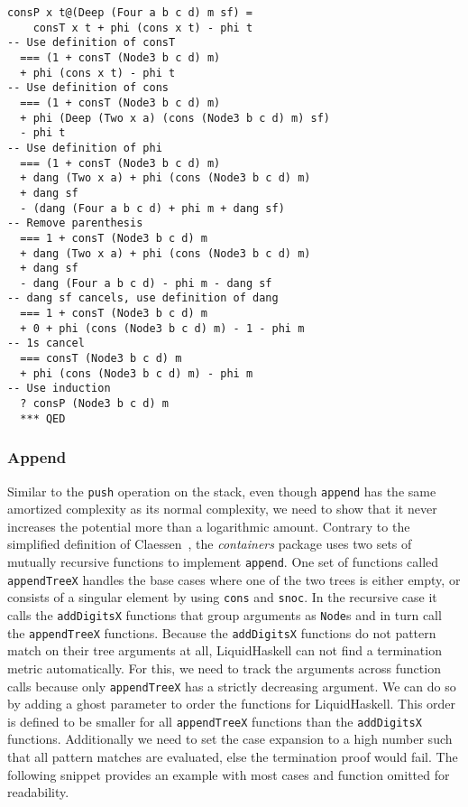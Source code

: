 \documentclass[sigplan,screen,review,anonymous]{acmart}
\begin{document}
\begin{lstlisting}
consP x t@(Deep (Four a b c d) m sf) =
    consT x t + phi (cons x t) - phi t
-- Use definition of consT
  === (1 + consT (Node3 b c d) m)
  + phi (cons x t) - phi t
-- Use definition of cons
  === (1 + consT (Node3 b c d) m)
  + phi (Deep (Two x a) (cons (Node3 b c d) m) sf)
  - phi t
-- Use definition of phi
  === (1 + consT (Node3 b c d) m)
  + dang (Two x a) + phi (cons (Node3 b c d) m)
  + dang sf
  - (dang (Four a b c d) + phi m + dang sf)
-- Remove parenthesis
  === 1 + consT (Node3 b c d) m
  + dang (Two x a) + phi (cons (Node3 b c d) m)
  + dang sf
  - dang (Four a b c d) - phi m - dang sf
-- dang sf cancels, use definition of dang
  === 1 + consT (Node3 b c d) m
  + 0 + phi (cons (Node3 b c d) m) - 1 - phi m
-- 1s cancel
  === consT (Node3 b c d) m
  + phi (cons (Node3 b c d) m) - phi m
-- Use induction
  ? consP (Node3 b c d) m
  *** QED
\end{lstlisting}

\subsubsection{Append}\label{sec:append}

Similar to the \texttt{push} operation on the stack, even though \texttt{append} has the same amortized complexity as its normal complexity, we need to show that it never increases the potential more than a logarithmic amount. Contrary to the simplified definition of Claessen~\cite{fingertrees_new}, the \textit{containers} package uses two sets of mutually recursive functions to implement \texttt{append}. One set of functions called \texttt{appendTreeX} handles the base cases where one of the two trees is either empty, or consists of a singular element by using \texttt{cons} and \texttt{snoc}. In the recursive case it calls the \texttt{addDigitsX} functions that group arguments as \texttt{Node}s and in turn call the \texttt{appendTreeX} functions. Because the \texttt{addDigitsX} functions do not pattern match on their tree arguments at all, LiquidHaskell can not find a termination metric automatically. For this, we need to track the arguments across function calls because only \texttt{appendTreeX} has a strictly decreasing argument. We can do so by adding a ghost parameter to order the functions for LiquidHaskell. This order is defined to be smaller for all \texttt{appendTreeX} functions than the \texttt{addDigitsX} functions. Additionally we need to set the case expansion to a high number such that all pattern matches are evaluated, else the termination proof would fail. The following snippet provides an example with most cases and function omitted for readability.
\end{document}
